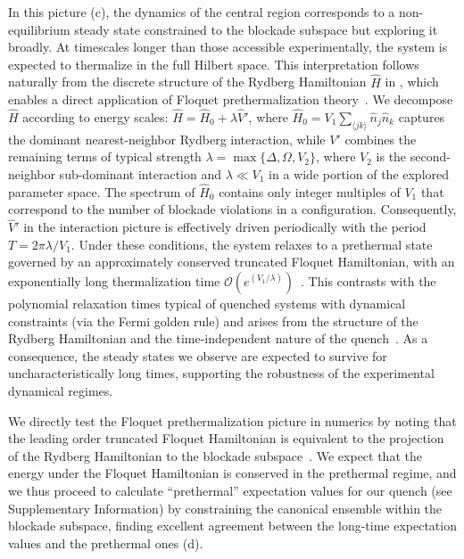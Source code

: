 \documentclass[english,floatfix,twocolumn,showpacs, aps, prx, reprint, superscriptaddress, longbibliography]{revtex4-2}
\begin{document}
In this picture (c), the dynamics of the central region corresponds to a non-equilibrium steady state constrained to the blockade subspace but exploring it broadly. At timescales longer than those accessible experimentally, the system is expected to thermalize in the full Hilbert space. This interpretation follows naturally from the discrete structure of the Rydberg Hamiltonian $\hat{H}$ in , which enables a direct application of Floquet prethermalization theory~\cite{Abanin:2017, Mori:2018, Haghshenas:2025}. We decompose $\hat{H}$ according to energy scales: $\hat{H} = \hat{H}_0 + \lambda \hat{V}'$, where $\hat{H}_0 = V_1 \sum_{\langle jk \rangle } \hat{n}_j \hat{n}_k$ captures the dominant nearest-neighbor Rydberg interaction, while $V'$ combines the remaining terms of typical strength $\lambda = \max{\{\Delta, \Omega, V_2 \}}$, where $V_2$ is the second-neighbor sub-dominant interaction and $\lambda \ll V_1$ in a wide portion of the explored parameter space. The spectrum of $\hat{H}_0$ contains only integer multiples of $V_1$ that correspond to the number of blockade violations in a configuration. Consequently, $\hat{V}'$ in the interaction picture is effectively driven periodically with the period $T = 2\pi \lambda/V_1$. Under these conditions, the system relaxes to a prethermal state governed by an approximately conserved truncated Floquet Hamiltonian, with an exponentially long thermalization time $\mathcal{O} \left(e^{(V_1/\lambda)} \right)$~\cite{Abanin:2017}. This contrasts with the polynomial relaxation times typical of quenched systems with dynamical constraints (via the Fermi golden rule) and arises from the structure of the Rydberg Hamiltonian and the time-independent nature of the quench~\cite{Mori:2018}. As a consequence, the steady states we observe are expected to survive for uncharacteristically long times, supporting the robustness of the experimental dynamical regimes.

We directly test the Floquet prethermalization picture in numerics by noting that the leading order truncated Floquet Hamiltonian is equivalent to the projection of the Rydberg Hamiltonian to the blockade subspace~\cite{Bernien:2017, Bluvstein:2021}. We expect that the energy under the Floquet Hamiltonian is conserved in the prethermal regime, and we thus proceed to calculate ``prethermal'' expectation values for our quench (see Supplementary Information) by constraining the canonical ensemble within the blockade subspace, finding excellent agreement between the long-time expectation values and the prethermal ones (d).
\end{document}

